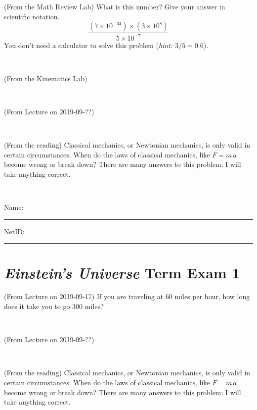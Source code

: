 \documentclass[12pt, letterpaper]{article}
\begin{document}
\clearpage


\begin{problem} (From the Math Review Lab)
What is this number? Give your answer in scientific notation.
$$
\frac{(7\times10^{-34})\times(3\times10^8)}{5\times10^{-7}}
$$
You don't need a calculator to solve this problem (\textit{hint: $3/5=0.6$}).
\end{problem}


\vfill ~

\begin{problem} (From the Kinematics Lab)

\end{problem}


\vfill ~

\begin{problem} (From Lecture on 2019-09-??)
\end{problem}


\vfill ~

\begin{problem} (From the reading)
Classical mechanics, or Newtonian mechanics, is only valid in certain
circumstances. When do the laws of classical mechanics, like $F =
m\,a$ become wrong or break down? There are many answers to this
problem; I will take anything correct.
\end{problem}


\vfill ~


\cleardoublepage



\noindent
Name: \rule[-1ex]{0.60\textwidth}{0.1pt}
NetID: \rule[-1ex]{0.20\textwidth}{0.1pt}

\section*{\textsl{Einstein's Universe} Term Exam 1}
\setcounter{problem}{1}


\begin{problem} (From Lecture on 2019-09-17)
If you are traveling at 60 miles per hour, how long does
it take you to go 300 miles?
\end{problem}


\vfill ~

\begin{problem} (From Lecture on 2019-09-??)
\end{problem}


\vfill ~

\begin{problem} (From the reading)
Classical mechanics, or Newtonian mechanics, is only valid in certain
circumstances. When do the laws of classical mechanics, like $F =
m\,a$ become wrong or break down? There are many answers to this
problem; I will take anything correct.
\end{problem}
\end{document}
